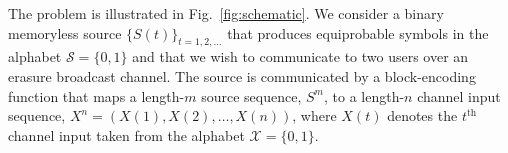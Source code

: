 The problem is illustrated in Fig.~\ref{fig:schematic}.  We consider {{}a} binary memoryless source $\{S(t)\}_{t=1,2, \ldots}$ that produces equiprobable symbols in the alphabet $\mathcal{S}=\{0,1\}$ and that we wish to communicate to two users over an erasure broadcast channel.  %
%
%
The source is communicated by a block-encoding function that maps a length-$m$ source sequence, $S^{m}$, to a length-$n$ channel input sequence, $X^{n} = (X(1), X(2), \ldots , X(n))$, where $X(t)$ denotes the $t^{\mathrm{th}}$ channel input taken from the alphabet $\mathcal{X} = \{0, 1\}$.  %


